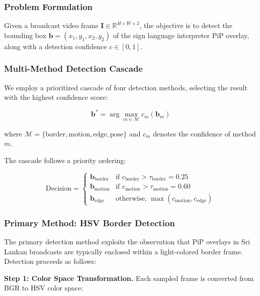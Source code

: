 \documentclass[journal]{IEEEtran}
\begin{document}
\subsubsection{Problem Formulation}

Given a broadcast video frame $\mathbf{I} \in \mathbb{R}^{H \times W \times 3}$, the objective is to detect the bounding box $\mathbf{b} = (x_1, y_1, x_2, y_2)$ of the sign language interpreter PiP overlay, along with a detection confidence $c \in [0, 1]$.

\subsubsection{Multi-Method Detection Cascade}

We employ a prioritized cascade of four detection methods, selecting the result with the highest confidence score:

\begin{equation}
\mathbf{b}^* = \arg\max_{m \in \mathcal{M}} c_m(\mathbf{b}_m)
\end{equation}

where $\mathcal{M} = \{\text{border}, \text{motion}, \text{edge}, \text{pose}\}$ and $c_m$ denotes the confidence of method $m$.

The cascade follows a priority ordering:

\begin{equation}
\text{Decision} = \begin{cases} 
\mathbf{b}_{\text{border}} & \text{if } c_{\text{border}} > \tau_{\text{border}} = 0.25 \\ 
\mathbf{b}_{\text{motion}} & \text{if } c_{\text{motion}} > \tau_{\text{motion}} = 0.60 \\ 
\mathbf{b}_{\text{edge}} & \text{otherwise, } \max(c_{\text{motion}}, c_{\text{edge}}) 
\end{cases}
\end{equation}

\subsubsection{Primary Method: HSV Border Detection}

The primary detection method exploits the observation that PiP overlays in Sri Lankan broadcasts are typically enclosed within a light-colored border frame. Detection proceeds as follows:

\textbf{Step 1: Color Space Transformation.} Each sampled frame is converted from BGR to HSV color space:
\end{document}
